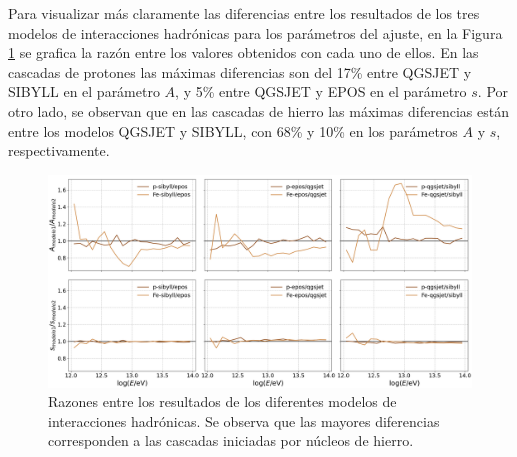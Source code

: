 \documentclass[12pt,letterpaper]{report}
\begin{document}
		Para visualizar m\'as claramente las diferencias entre los resultados de los tres modelos de interacciones hadr\'onicas para los par\'ametros del ajuste, en la Figura \ref{fig:models_ratios} se grafica la raz\'on entre los valores obtenidos con cada uno de ellos. En las cascadas de protones las m\'aximas diferencias son del 17\% entre QGSJET y SIBYLL en el par\'ametro $A$, y 5\% entre QGSJET y EPOS en el par\'ametro $s$. Por otro lado, se observan que en las cascadas de hierro las m\'aximas diferencias est\'an entre los modelos QGSJET y SIBYLL, con 68\% y 10\% en los par\'ametros $A$ y $s$, respectivamente.
		\begin{figure} [h]
		\includegraphics[width=\textwidth]{Figuras/models_ratios}
		\caption{Razones entre los resultados de los diferentes modelos de interacciones hadr\'onicas. Se observa que las mayores diferencias corresponden a las cascadas iniciadas por n\'ucleos de hierro.}
		\label{fig:models_ratios}
		\end{figure}
	
%	
		
		
\end{document}
